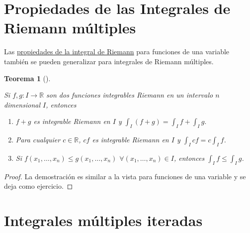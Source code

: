 \documentclass[
  a4paper,
]{scrreport}
\theoremstyle{plain}
\newtheorem{theorem}{Teorema}[chapter]
\theoremstyle{definition}
\theoremstyle{plain}
\theoremstyle{plain}
\theoremstyle{definition}
\theoremstyle{definition}
\theoremstyle{remark}
\begin{document}
\section{Propiedades de las Integrales de Riemann
múltiples}\label{propiedades-de-las-integrales-de-riemann-muxfaltiples}

Las
\href{http://localhost:1313/08-integrales.html\#propiedades-de-la-integral-de-riemann}{propiedades
de la integral de Riemann} para funciones de una variable también se
pueden generalizar para integrales de Riemann múltiples.

\begin{theorem}[]\protect\hypertarget{thm-propiedades-integrales-Riemann-multiples}{}\label{thm-propiedades-integrales-Riemann-multiples}

Si \(f,g:I\to\mathbb{R}\) son dos funciones integrables Riemann en un
intervalo \(n\) dimensional \(I\), entonces

\begin{enumerate}
\def\labelenumi{\alph{enumi}.}
\item
  \(f+g\) es integrable Riemann en \(I\) y
  \(\int_I (f+g) = \int_I f + \int_I g.\)
\item
  Para cualquier \(c\in\mathbb{R}\), \(cf\) es integrable Riemann en
  \(I\) y \(\int_I cf = c\int_I f\).
\item
  Si \(f(x_1,\ldots,x_n) \leq g(x_1,\ldots,x_n)\)
  \(\forall (x_1,\ldots,x_n)\in I\), entonces
  \(\int_I f \leq \int_I g\).
\end{enumerate}

\end{theorem}

\begin{tcolorbox}[enhanced jigsaw, titlerule=0mm, arc=.35mm, colframe=quarto-callout-note-color-frame, bottomrule=.15mm, opacitybacktitle=0.6, rightrule=.15mm, coltitle=black, colback=white, toprule=.15mm, title=\textcolor{quarto-callout-note-color}{\faInfo}\hspace{0.5em}{Demostración}, leftrule=.75mm, bottomtitle=1mm, opacityback=0, breakable, colbacktitle=quarto-callout-note-color!10!white, toptitle=1mm, left=2mm]

\begin{proof}
La demostración es similar a la vista para funciones de una variable y
se deja como ejercicio.
\end{proof}

\end{tcolorbox}

\section{Integrales múltiples
iteradas}\label{integrales-muxfaltiples-iteradas}
\end{document}
